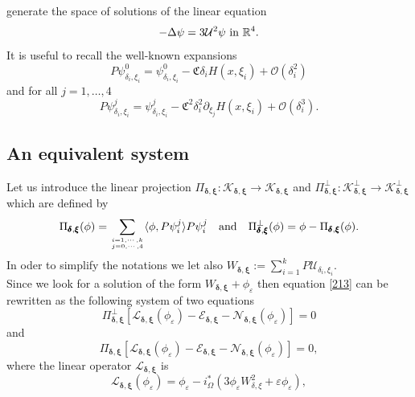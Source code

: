 \documentclass[11pt,a4paper]{amsart}
\newcommand{\e}{\varepsilon}
\renewcommand{\d }{\delta }
\newcommand{\Ua}{{\mathcal{U}}}
\newcommand{\Ui}{{\mathcal{U}_{\delta_i, \xi_i}}}
\theoremstyle{definition}
\renewcommand{\(}{\left(}
\renewcommand{\)}{\right)}
\begin{document}
generate the space of solutions of the linear equation
\begin{equation*}
-\Delta \psi = 3\Ua^{2} \psi \ \hbox{in} \   \mathbb{R}^{4}.
\end{equation*}
It is useful to recall the well-known expansions
\begin{equation}\label{expderi}
P \psi^{0}_{\delta_{i}, \xi_{i}} =\psi^{0}_{\delta_{i}, \xi_{i}} -\mathfrak C\delta_i H(x, \xi_i)+\mathcal O(\delta_i^2)\end{equation}
and for all $j=1, \ldots, 4$
\begin{equation}\label{expderi1}
P \psi^{j}_{\delta_{i}, \xi_{i}} =\psi^{j}_{\delta_{i}, \xi_{i}} - \mathfrak C^2\delta_i^2\partial_{\xi_j} H(x, \xi_i)+\mathcal O(\delta_i^3).\end{equation}
\subsection{An equivalent system}
Let us introduce the linear projection $\Pi_{\pmb{\d}, \pmb{\xi}} : \mathcal K_{\pmb{\d}, \pmb{\xi}} \to \mathcal K_{\pmb{\d}, \pmb{\xi}}$ and $\Pi^{\perp}_{\pmb{\d}, \pmb{\xi}} : \mathcal K^{\perp}_{\pmb{\d}, \pmb{\xi}} \to \mathcal K^{\perp}_{\pmb{\d}, \pmb{\xi}}$ which are defined by 
\begin{equation*}
\Pi_{\pmb{\d}, \pmb{\xi}}(\phi) = \sum_{i=1, \cdots, k \atop j=0, \cdots, 4} \langle \phi, P \psi_{i}^{j} \rangle P \psi_{i}^{j} \quad\mbox{and}\quad\Pi^{\perp}_{\pmb{\d}, \pmb{\xi}}(\phi) = \phi - \Pi_{\pmb{\d}, \pmb{\xi}}(\phi).
\end{equation*}
In oder to simplify the notations we let also $W_{\pmb{\d}, \pmb{\xi}}:=\sum_{i=1}^k P\Ui$. \\ Since we look for a solution of the form $W_{\pmb{\d}, \pmb{\xi}}+\phi_\e$ then
equation \eqref{213} can be rewritten as the following system of two equations 
\begin{equation}\label{10}
\Pi^{\perp}_{\pmb{\d}, \pmb{\xi}} [ \mathcal{L}_{\pmb{\d}, \pmb{\xi}}(\phi_\e) - \mathcal{E}_{\pmb{\d}, \pmb{\xi}} - \mathcal{N}_{\pmb{\d}, \pmb{\xi}}(\phi_\e)] = 0
\end{equation}
and
\begin{equation}\label{11}
\Pi_{\pmb{\d}, \pmb{\xi}} [\mathcal{L}_{\pmb{\d}, \pmb{\xi}}(\phi_\e) - \mathcal{E}_{\pmb{\d}, \pmb{\xi}} - \mathcal{N}_{\pmb{\d}, \pmb{\xi}}(\phi_\e)] = 0,
\end{equation}
where the linear operator $\mathcal{L}_{\pmb{\d}, \pmb{\xi}}$ is 
\begin{equation}\label{29}
\mathcal{L}_{\pmb{\d}, \pmb{\xi}}(\phi_\e) = \phi_\e - i^{*}_\Omega(3\phi_\e W_{\delta, \xi}^{2} + \varepsilon \phi_\e),
\end{equation}
\end{document}

